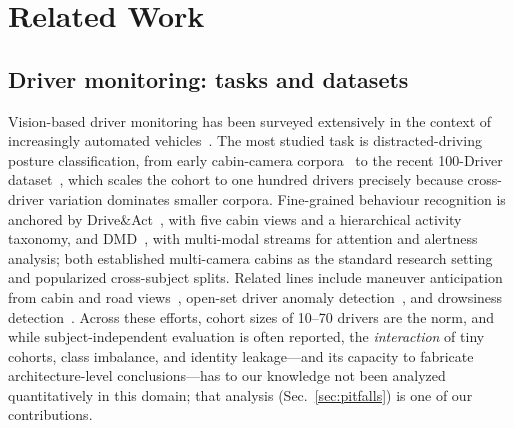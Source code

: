 \documentclass[journal]{IEEEtran}
\begin{document}
\section{Related Work}
\label{sec:related}

\subsection{Driver monitoring: tasks and datasets}
Vision-based driver monitoring has been surveyed extensively in the context
of increasingly automated vehicles~\cite{ohnbar2016looking}.  The most
studied task is distracted-driving posture classification, from early
cabin-camera corpora~\cite{abouelnaga2018distracted} to the recent
100-Driver dataset~\cite{wang2023driver100}, which scales the cohort to one
hundred drivers precisely because cross-driver variation dominates smaller
corpora.  Fine-grained behaviour recognition is anchored by
Drive\&Act~\cite{martin2019driveact}, with five cabin views and a
hierarchical activity taxonomy, and DMD~\cite{ortega2020dmd}, with
multi-modal streams for attention and alertness analysis; both established
multi-camera cabins as the standard research setting and popularized
cross-subject splits.  Related lines include maneuver anticipation from
cabin and road views~\cite{jain2015brain4cars}, open-set driver anomaly
detection~\cite{kopuklu2021dad}, and drowsiness
detection~\cite{weng2016nthu}.  Across these efforts, cohort sizes of
10--70 drivers are the norm, and while subject-independent evaluation is
often reported, the \emph{interaction} of tiny cohorts, class imbalance,
and identity leakage---and its capacity to fabricate architecture-level
conclusions---has to our knowledge not been analyzed quantitatively in this
domain; that analysis (Sec.~\ref{sec:pitfalls}) is one of our
contributions.
\end{document}
